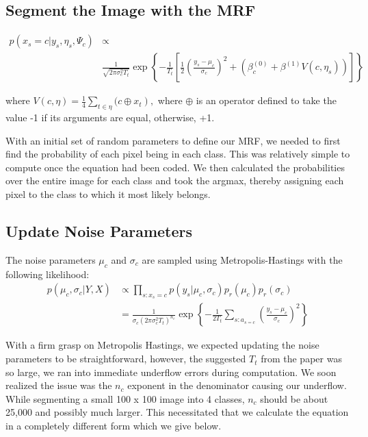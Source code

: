 \documentclass[11pt]{article}
\begin{document}
\subsection{Segment the Image with the MRF}
\begin{equation}
\begin{aligned}
p\left(x_{s} = c | y_{s}, \eta_{s}, \Psi_{c}\right) & \propto \\
&\frac{1}{\sqrt{2 \pi \sigma_{c}^{2} T_{t}}} \exp \left\{ -\frac{1}{T_{t}} \left[\frac{1}{2} \left(\frac{y_{s}-\mu_{c}}{\sigma_{c}}\right)^{2} + \left( \beta_{c}^{(0)} + \beta^{(1)} V(c, \eta_{s}) \right) \right] \right\}
\end{aligned}
\end{equation}

where $V(c, \eta)=\frac{1}{4} \sum_{t \in \eta}(c \oplus\left.x_{t}\right),$ where $\oplus$ is an operator defined to take the value -1 if its arguments are equal, otherwise, +1.

With an initial set of random parameters to define our MRF, we needed to first find the probability of each pixel being in each class.
This was relatively simple to compute once the equation had been coded.
We then calculated the probabilities over the entire image for each class and took the argmax, thereby assigning each pixel to the class to which it most likely belongs.


\subsection{Update Noise Parameters}
The noise parameters $\mu_{c}$ and $\sigma_{c}$ are sampled using Metropolis-Hastings with the following likelihood:
\begin{equation}
\begin{aligned}
p\left(\mu_{c}, \sigma_{c} | Y, X\right) & \propto \prod_{s: x_{s}=c} p\left(y_{s} | \mu_{c}, \sigma_{c}\right) p_{r}\left(\mu_{c}\right) p_{r}\left(\sigma_{c}\right) \\
&=\frac{1}{\sigma_{c}\left(2 \pi \sigma_{c}^{2} T_{t}\right)^{n_{c}}} \exp \left\{-\frac{1}{2 T_{t}} \sum_{s: a_{s=c}}\left(\frac{y_{s}-\mu_{c}}{\sigma_{c}}\right)^{2}\right\}
\end{aligned}
\end{equation}

With a firm grasp on Metropolis Hastings, we expected updating the noise parameters to be straightforward, however, the suggested $T_{t}$ from the paper was so large, we ran into immediate underflow errors during computation.
We soon realized the issue was the $n_{c}$ exponent in the denominator causing our underflow.
While segmenting a small 100 x 100 image into 4 classes, $n_{c}$ should be about 25,000 and possibly much larger.
This necessitated that we calculate the equation in a completely different form which we give below.
\end{document}
